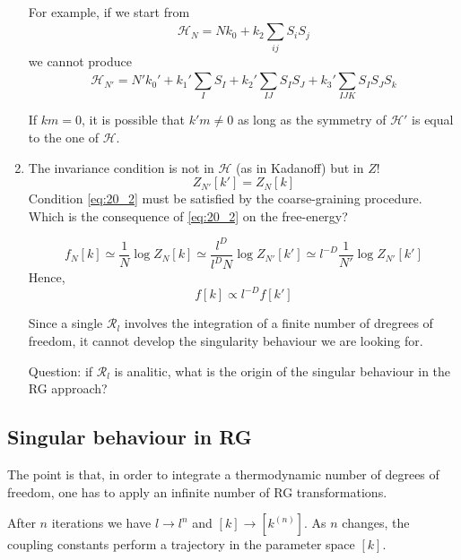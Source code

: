 \documentclass[../main/main.tex]{subfiles}
\begin{document}
\begin{enumerate}
For example, if we start from
\begin{equation}
  \mathcal{H}_N = N k_0 + k_2 \sum_{ij}^{} S_i S_j
\end{equation}
we cannot produce
\begin{equation}
  \mathcal{H}_{N'} = N' k_0' + k_1' \sum_{I}^{} S_I + k_2' \sum_{IJ}^{} S_I S_J
  + k_3' \sum_{IJK}^{} S_I S_J S_k
\end{equation}
\begin{remark}
If \( km=0 \), it is possible that \( k'm \neq 0 \) as long as the symmetry of \( \mathcal{H}' \) is equal to the one of \( \mathcal{H} \).
\end{remark}

\item The invariance condition is not in \( \mathcal{H} \) (as in Kadanoff) but in \( Z \)!
\begin{equation}
  Z_{N'} [k'] = Z_N [k]
  \label{eq:20_2}
\end{equation}
  Condition \eqref{eq:20_2} must be satisfied by the coarse-graining procedure. Which is the consequence of \eqref{eq:20_2} on the free-energy?

  \begin{equation}
  f_N [k]  \simeq \frac{1}{N} \log{Z_N [k]} \simeq \frac{l^D}{l^D N} \log{Z_{N'}[k']} \simeq l^{-D} \frac{1}{N'} \log{Z_{N'}} [k']
  \end{equation}
Hence,
\begin{equation}
  f [k] \propto l^{-D} f [k']
\end{equation}
\begin{remark}
Since a single \( \mathcal{R}_l \) involves the integration of a finite number of dregrees of freedom, it cannot develop the singularity behaviour we are looking for.
\end{remark}
Question: if \( \mathcal{R}_l \) is analitic, what is the origin of the singular behaviour in the RG approach?
\end{enumerate}

\subsection{Singular behaviour in RG}
The point is that, in order to integrate a thermodynamic number of degrees of freedom, one has to apply an infinite number of RG transformations.

After \( n \) iterations we have \( l \rightarrow l^n \) and \( [k] \rightarrow [k^{(n)}] \).  As \( n \) changes, the coupling constants perform a trajectory in the parameter space \( [k] \).
\end{document}
